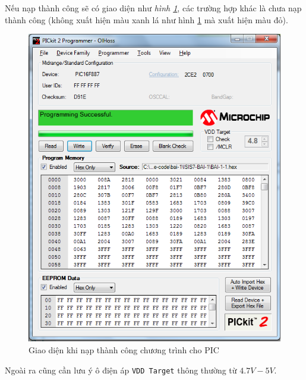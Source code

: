 Nếu nạp thành công sẽ có giao diện như \textit{hình \ref{Fig:PICKIT-2-1}}, các trường hợp khác là chưa nạp thành công (không xuất hiện màu xanh lá như hình \ref{Fig:PICKIT-2-1} mà xuất hiện màu đỏ).
\begin{figure}[!h]
\begin{center}
\includegraphics[scale=.5]{phu-luc/image/pickit-22}
\end{center}
\caption{Giao diện khi nạp thành công chương trình cho PIC}
\label{Fig:PICKIT-2-1}
\end{figure}

Ngoài ra cũng cần lưu ý ô điện áp \verb|VDD Target| thông thường từ $4.7V - 5V$.